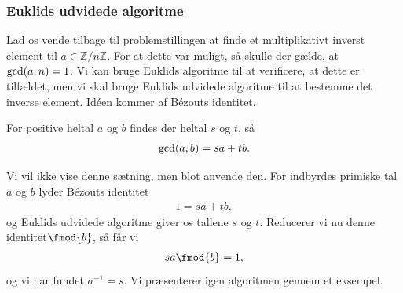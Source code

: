 \subsubsection*{Euklids udvidede algoritme}
Lad os vende tilbage til problemstillingen at finde et multiplikativt inverst element til $a\in \mathbb{Z}/n\mathbb{Z}$. For at dette var muligt, så skulle der gælde, at $\textnormal{gcd}(a,n)=1$. Vi kan bruge Euklids algoritme til at verificere, at dette er tilfældet, men vi skal bruge Euklids udvidede algoritme til at bestemme det inverse element. Idéen kommer af Bézouts identitet.
\begin{setn}
For positive heltal $a$ og $b$ findes der heltal $s$ og $t$, så
\begin{align*}
\textnormal{gcd}(a,b) = sa + tb.
\end{align*}
\end{setn}
Vi vil ikke vise denne sætning, men blot anvende den. For indbyrdes primiske tal $a$ og $b$ lyder Bézouts identitet
\begin{align*}
	1 = sa+tb,
\end{align*}
og Euklids udvidede algoritme giver os tallene $s$ og $t$. Reducerer vi nu denne identitet$\fmod{b}$, så får vi
\begin{align*}
	sa \fmod{b} = 1,
\end{align*}
og vi har fundet $a^{-1} = s$. Vi præsenterer igen algoritmen gennem et eksempel.
